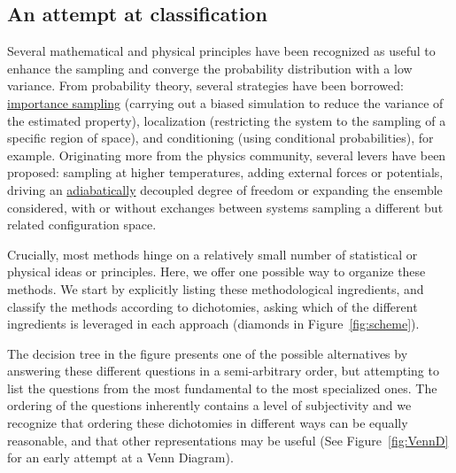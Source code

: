 \documentclass[9pt,review]{livecoms}
\begin{document}
\subsection{An attempt at classification}

Several mathematical and physical principles have been recognized as useful to enhance the sampling and converge the probability distribution with a low variance.
From probability theory, several strategies have been borrowed: \hyperlink{ref:IS}{importance sampling} (carrying out a biased simulation to reduce the variance of the estimated property), localization (restricting the system to the sampling of a specific region of space), and conditioning (using conditional probabilities), for example. Originating more from the physics community, several levers have been proposed: sampling at higher temperatures, adding external forces or potentials, driving an \hyperlink{ref:AdiabaticDyn} {adiabatically} decoupled degree of freedom or expanding the ensemble considered, with or without exchanges between systems sampling a different but related configuration space.

Crucially, most methods hinge on a relatively small number of statistical or physical ideas or principles. Here, we offer one possible way to organize these methods. We  start by explicitly listing these methodological ingredients, and classify the methods according to dichotomies, asking which of the different ingredients is leveraged in each approach (diamonds in Figure~\ref{fig:scheme}).

The decision tree in the figure presents one of the possible alternatives by answering these different questions in a semi-arbitrary order, but attempting to list the questions from the most fundamental to the most specialized ones. The ordering of the questions inherently contains a level of subjectivity and we recognize that ordering these dichotomies in different ways can be equally reasonable, and that other representations may be useful (See Figure~\ref{fig:VennD} for an early attempt at a Venn Diagram).
\end{document}
